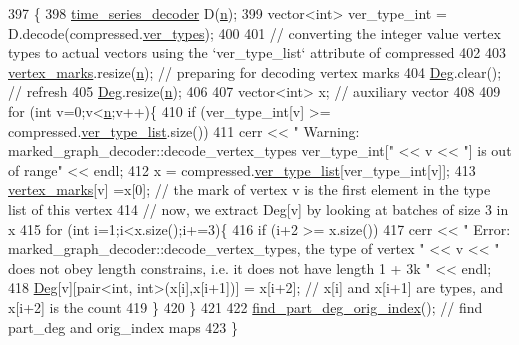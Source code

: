 \begin{DoxyCode}
397 \{
398   \hyperlink{classtime__series__decoder}{time\_series\_decoder} D(\hyperlink{classmarked__graph__decoder_aefc93611bc4a3e9a5d3956d97649a0e9}{n});
399   vector<int> ver\_type\_int = D.decode(compressed.\hyperlink{classmarked__graph__compressed_af446cc5e23c241a92b76642fd5ebc403}{ver\_types});
400 
401   \textcolor{comment}{// converting the integer value vertex types to actual vectors using the `ver\_type\_list` attribute of
       compressed}
402 
403   \hyperlink{classmarked__graph__decoder_a98be932a5abff7efbc8dd4290268b69a}{vertex\_marks}.resize(\hyperlink{classmarked__graph__decoder_aefc93611bc4a3e9a5d3956d97649a0e9}{n}); \textcolor{comment}{// preparing for decoding vertex marks}
404   \hyperlink{classmarked__graph__decoder_a5040ad86467693eab415f615408bfb9e}{Deg}.clear(); \textcolor{comment}{// refresh}
405   \hyperlink{classmarked__graph__decoder_a5040ad86467693eab415f615408bfb9e}{Deg}.resize(\hyperlink{classmarked__graph__decoder_aefc93611bc4a3e9a5d3956d97649a0e9}{n});
406 
407   vector<int> x; \textcolor{comment}{// auxiliary vector}
408 
409   \textcolor{keywordflow}{for} (\textcolor{keywordtype}{int} v=0;v<\hyperlink{classmarked__graph__decoder_aefc93611bc4a3e9a5d3956d97649a0e9}{n};v++)\{
410     \textcolor{keywordflow}{if} (ver\_type\_int[v] >= compressed.\hyperlink{classmarked__graph__compressed_af2e3e55223d436628a02758dfae88493}{ver\_type\_list}.size())
411       cerr << \textcolor{stringliteral}{" Warning: marked\_graph\_decoder::decode\_vertex\_types ver\_type\_int["} << v << \textcolor{stringliteral}{"] is out of
       range"} << endl;
412     x = compressed.\hyperlink{classmarked__graph__compressed_af2e3e55223d436628a02758dfae88493}{ver\_type\_list}[ver\_type\_int[v]];
413     \hyperlink{classmarked__graph__decoder_a98be932a5abff7efbc8dd4290268b69a}{vertex\_marks}[v] =x[0]; \textcolor{comment}{// the mark of vertex v is the first element in the type list of
       this vertex}
414     \textcolor{comment}{// now, we extract Deg[v] by looking at batches of size 3 in x}
415     \textcolor{keywordflow}{for} (\textcolor{keywordtype}{int} i=1;i<x.size();i+=3)\{
416       \textcolor{keywordflow}{if} (i+2 >= x.size())
417         cerr << \textcolor{stringliteral}{" Error: marked\_graph\_decoder::decode\_vertex\_types, the type of vertex "} << v << \textcolor{stringliteral}{" does not
       obey length constrains, i.e. it does not have length 1 + 3k "} << endl;
418           \hyperlink{classmarked__graph__decoder_a5040ad86467693eab415f615408bfb9e}{Deg}[v][pair<int, int>(x[i],x[i+1])] = x[i+2]; \textcolor{comment}{// x[i] and x[i+1] are types, and x[i+2] is the
       count}
419     \}
420   \}
421 
422   \hyperlink{classmarked__graph__decoder_a1e035914395d2a3a50064b758c478ffd}{find\_part\_deg\_orig\_index}(); \textcolor{comment}{// find part\_deg and orig\_index maps}
423 \}
\end{DoxyCode}
